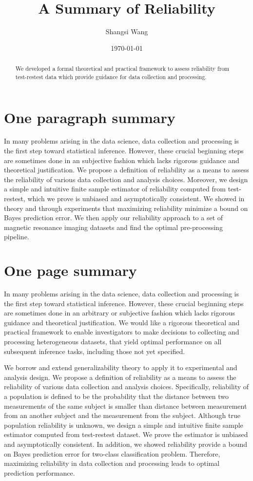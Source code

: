 \documentclass[a4paper]{article}
\title{A Summary of Reliability}
\author{Shangsi Wang}
\date{\today}
\begin{document}
\maketitle

\begin{abstract}
We developed a formal theoretical and practical framework to assess reliability from test-restest data which provide guidance for data collection and processing. 
\end{abstract}

\section{One paragraph summary}
In many problems arising in the data science, data collection and processing is the first step toward statistical inference. However, these crucial beginning steps are sometimes done in an subjective fashion which lacks rigorous guidance and theoretical justification. We propose a definition of reliability as a means to assess the reliability of various data collection and analysis choices. Moreover, we design a simple and intuitive finite sample estimator of reliability computed from test-restest, which we prove is unbiased and asymptotically consistent. We showed in theory and through experiments that maximizing reliability minimize a bound on Bayes prediction error. We then apply our reliability approach to a set of magnetic resonance imaging datasets and find the optimal pre-processing pipeline.



\section{One page summary}
In many problems arising in the data science, data collection and processing is the first step toward statistical inference. However, these crucial beginning steps are sometimes done in an arbitrary or subjective fashion which lacks rigorous guidance and theoretical justification. We would like a rigorous theoretical and practical framework to enable investigators to make decisions to collecting and processing heterogeneous datasets, that yield optimal performance on all subsequent inference tasks, including those not yet specified.

\noindent We borrow and extend generalizability theory to apply it to experimental and analysis design. We propose a definition of reliability as a means to assess the reliability of various data collection and analysis choices. Specifically, reliability of a population is defined to be the probability that the distance between two measurements of the same subject is smaller than distance between measurement from an another subject and the measurement from the subject. Although true population reliability is unknown, we design a simple and intuitive finite sample estimator computed from test-restest dataset. We prove the estimator is unbiased and asymptotically consistent. In addition, we showed reliability provide a bound on Bayes prediction error for two-class classification problem. Therefore, maximizing reliability in data collection and processing leads to optimal prediction performance.
\end{document}
